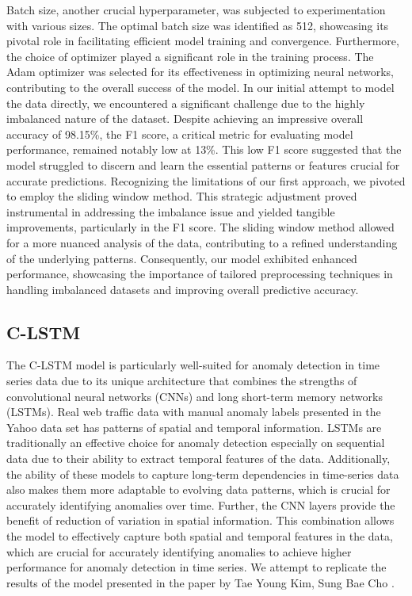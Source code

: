 \documentclass[10pt,twocolumn,letterpaper]{article}
\begin{document}
Batch size, another crucial hyperparameter, was subjected to experimentation with various sizes. The optimal batch size was identified as 512, showcasing its pivotal role in facilitating efficient model 
training and convergence. Furthermore, the choice of optimizer played a significant role in the training process. The Adam optimizer was selected for its effectiveness in optimizing neural networks, 
contributing to the overall success of the model.
In our initial attempt to model the data directly, we encountered a significant challenge due to the highly imbalanced nature of the dataset. 
Despite achieving an impressive overall accuracy of 98.15\%, the F1 score, a critical metric for evaluating model performance, remained notably low at 13\%. This low F1 score suggested that the model 
struggled to discern and learn the essential patterns or features crucial for accurate predictions.
Recognizing the limitations of our first approach, we pivoted to employ the sliding window method. This strategic adjustment proved instrumental in addressing the imbalance issue and yielded 
tangible improvements, particularly in the F1 score. The sliding window method allowed for a more nuanced analysis of the data, contributing to a refined understanding of the underlying patterns. 
Consequently, our model exhibited enhanced performance, showcasing the importance of tailored preprocessing techniques in handling imbalanced datasets and improving overall predictive accuracy.


\subsection{C-LSTM}
The C-LSTM model is particularly well-suited for anomaly detection in time series data due to its unique architecture that combines the strengths of convolutional neural networks (CNNs) and 
long short-term memory networks (LSTMs). Real web traffic data with manual anomaly labels presented in the Yahoo data set has patterns of spatial and temporal information. LSTMs are traditionally an 
effective choice for anomaly detection especially on sequential data due to their ability to extract temporal features of the data. Additionally, the ability of these models to capture long-term dependencies 
in time-series data also makes them more adaptable to evolving data patterns, which is crucial for accurately identifying anomalies over time. Further, the CNN layers provide the benefit of reduction of 
variation in spatial information.  This combination allows the model to effectively capture both spatial and temporal features in the data, which are crucial for accurately identifying anomalies \cite{kim2018web} to 
achieve higher performance for anomaly detection in time series. We attempt to replicate the results of the model presented in the paper by Tae Young Kim, Sung Bae Cho \cite{kim2018web}.
\end{document}
